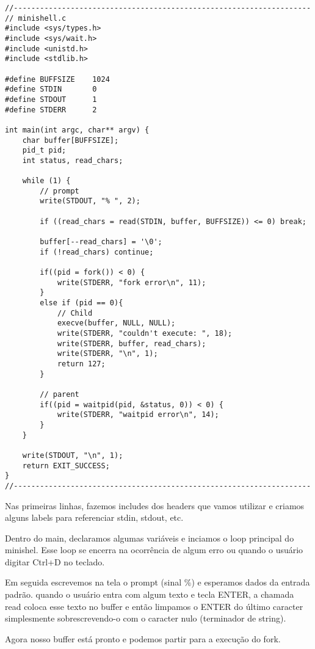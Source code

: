 \newpage
\begin{espacosimples}
\begin{verbatim}
//--------------------------------------------------------------------
// minishell.c
#include <sys/types.h>
#include <sys/wait.h>
#include <unistd.h>
#include <stdlib.h>

#define BUFFSIZE    1024
#define STDIN       0
#define STDOUT      1
#define STDERR      2

int main(int argc, char** argv) {
    char buffer[BUFFSIZE];
    pid_t pid;
    int status, read_chars;
    
    while (1) {
        // prompt
        write(STDOUT, "% ", 2);
        
        if ((read_chars = read(STDIN, buffer, BUFFSIZE)) <= 0) break;
        
        buffer[--read_chars] = '\0';
        if (!read_chars) continue;
        
        if((pid = fork()) < 0) {
            write(STDERR, "fork error\n", 11);
        }
        else if (pid == 0){
            // Child
            execve(buffer, NULL, NULL);
            write(STDERR, "couldn't execute: ", 18);
            write(STDERR, buffer, read_chars);
            write(STDERR, "\n", 1);
            return 127;
        }
        
        // parent
        if((pid = waitpid(pid, &status, 0)) < 0) {
            write(STDERR, "waitpid error\n", 14);
        }
    }
    
    write(STDOUT, "\n", 1);
    return EXIT_SUCCESS;
}
//--------------------------------------------------------------------
\end{verbatim}
\end{espacosimples}

Nas primeiras linhas, fazemos includes dos headers que vamos utilizar e criamos alguns labels para referenciar stdin, stdout, etc.

Dentro do main, declaramos algumas variáveis e inciamos o loop principal do minishel. Esse loop se encerra na ocorrência de algum erro ou quando o usuário digitar Ctrl+D no teclado.

Em seguida escrevemos na tela o prompt (sinal \%{}) e esperamos dados da entrada padrão. quando o usuário entra com algum texto e tecla ENTER, a chamada read coloca esse texto no buffer e então limpamos o ENTER do último caracter simplesmente sobrescrevendo-o com o caracter nulo (terminador de string).

Agora nosso buffer está pronto e podemos partir para a execução do fork.

